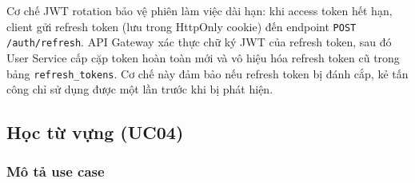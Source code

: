 \documentclass[a4paper,12pt]{extreport}
\begin{document}
\begin{sloppypar}
Cơ chế JWT rotation bảo vệ phiên làm việc dài hạn: khi access token hết hạn, client gửi refresh token (lưu trong HttpOnly cookie) đến endpoint \texttt{POST /auth/refresh}. API Gateway xác thực chữ ký JWT của refresh token, sau đó User Service cấp cặp token hoàn toàn mới và vô hiệu hóa refresh token cũ trong bảng \texttt{refresh\_tokens}. Cơ chế này đảm bảo nếu refresh token bị đánh cắp, kẻ tấn công chỉ sử dụng được một lần trước khi bị phát hiện.
\end{sloppypar}

\subsection{Học từ vựng (UC04)}
\subsubsection{Mô tả use case}
\end{document}
